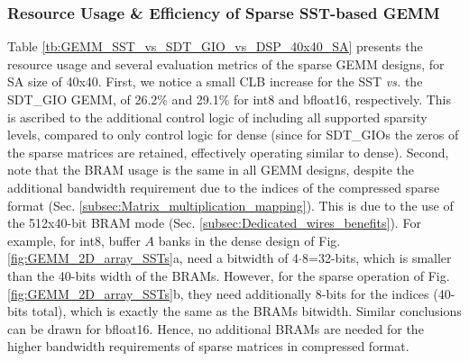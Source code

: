 













\subsubsection{Resource Usage \& Efficiency of Sparse SST-based GEMM}

Table \ref{tb:GEMM_SST_vs_SDT_GIO_vs_DSP_40x40_SA} presents the resource usage and several evaluation metrics of the sparse GEMM designs, for SA size of 40x40.
First, we notice a small CLB increase for the SST \emph{vs.} the SDT\_GIO GEMM, of 26.2\% and 29.1\% for int8 and bfloat16, respectively.
This is ascribed to the additional control logic of including all supported sparsity levels, compared to only control logic for dense (since for SDT\_GIOs the zeros of the sparse matrices are retained, effectively operating similar to dense).
Second, note that the BRAM usage is the same in all GEMM designs, despite the additional bandwidth requirement due to the indices of the compressed sparse format (Sec. \ref{subsec:Matrix_multiplication_mapping}).
This is due to the use of the 512x40-bit BRAM mode (Sec. \ref{subsec:Dedicated_wires_benefits}). 
For example, for int8, buffer $A$ banks in the dense design of Fig. \ref{fig:GEMM_2D_array_SSTs}a, need a bitwidth of 4$\cdot$8=32-bits, which is smaller than the 40-bits width of the BRAMs.
However, for the sparse operation of Fig. \ref{fig:GEMM_2D_array_SSTs}b, they need additionally 8-bits for the indices (40-bits total), which is exactly the same as the BRAMs bitwidth.
Similar conclusions can be drawn for bfloat16.
Hence, no additional BRAMs are needed for the higher bandwidth requirements of sparse matrices in compressed format.


